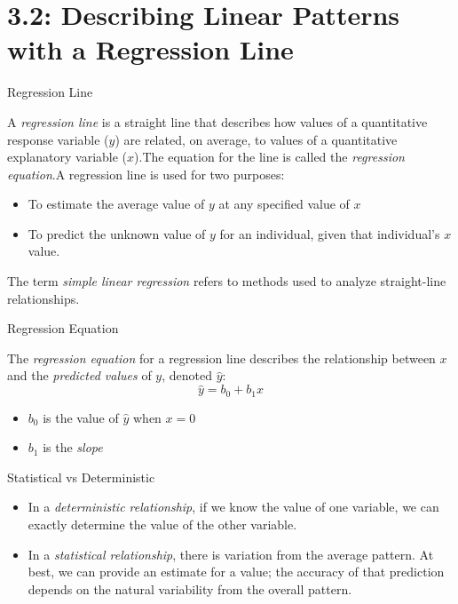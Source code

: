 \documentclass[Lecture.tex]{subfiles}
\begin{document}
\section{3.2: Describing Linear Patterns with a Regression Line}

\begin{frame}{Regression Line}
  \begin{defn}
  A {\it regression line} is a straight line that describes how values of a quantitative response variable ($y$) are related, on average, to values of a quantitative explanatory variable ($x$).\pause  The equation for the line is called the {\it regression equation}.\pause A regression line is used for two purposes:
  \begin{itemize}
  \item<1->
  	To estimate the average value of $y$ at any specified value of $x$
  \item<2->
  	To predict the unknown value of $y$ for an individual, given that individual's $x$ value.
  \end{itemize}
 The term {\it simple linear regression} refers to methods used to analyze straight-line relationships.
 \end{defn}
\end{frame}


\begin{frame}{Regression Equation}
\begin{defn}
The {\it regression equation} for a regression line describes the relationship between $x$ and the {\it predicted values} of $y$, denoted $\hat y$: $$\hat y=b_0+b_1x$$
\end{defn}
\begin{rmk}
\begin{itemize}
\item<1->
 $b_0$ is the value of $\hat y$ when $x=0$
\item<2->
 $b_1$ is the {\it slope}
\end{itemize}
\end{rmk}
\end{frame}
  

\begin{frame}{Statistical vs Deterministic}
\begin{defn}
\begin{itemize}
\item<1->
In a {\it deterministic relationship}, if we know the value of one variable, we can exactly determine the value of the other variable.  
\item<2->
In a {\it statistical relationship}, there is variation from the average pattern.  At best, we can provide an estimate for a value; the accuracy of that prediction depends on the natural variability from the overall pattern.
\end{itemize}
\end{defn}
\end{frame}
\end{document}
